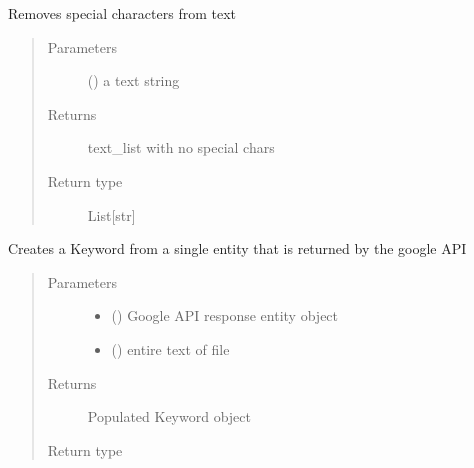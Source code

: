 \documentclass[letterpaper,10pt,english]{sphinxmanual}
\begin{document}
\begin{fulllineitems}
\label{\detokenize{functionsv1:common_functions.cleantext}}
Removes special characters from text
\begin{quote}\begin{description}
\item[{Parameters}] \leavevmode
{} (\sphinxstyleliteralemphasis{{[}}\sphinxstyleliteralemphasis{{]}}) \textendash{} a text string

\item[{Returns}] \leavevmode
text\_list with no special chars

\item[{Return type}] \leavevmode
List{[}str{]}

\end{description}\end{quote}

\end{fulllineitems}


\begin{fulllineitems}
\label{\detokenize{functionsv1:common_functions.createkeywordfromgoogleapientity}}
Creates a Keyword from a single entity that is returned by the google API
\begin{quote}\begin{description}
\item[{Parameters}] \leavevmode\begin{itemize}
\item {} 
 () \textendash{} Google API response entity object

\item {} 
 (\sphinxstyleliteralemphasis{{[}}\sphinxstyleliteralemphasis{{]}}) \textendash{} entire text of file

\end{itemize}

\item[{Returns}] \leavevmode
Populated Keyword object

\item[{Return type}] \leavevmode
{\hyperref[\detokenize{Keyword:module-Keyword}]{}}

\end{description}\end{quote}

\end{fulllineitems}
\end{document}
